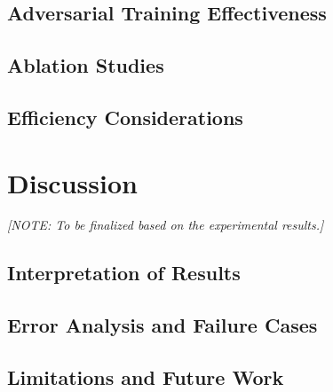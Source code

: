 \documentclass[conference,10pt]{IEEEtran}
\begin{document}
\subsection{Adversarial Training Effectiveness}

\subsection{Ablation Studies}

\subsection{Efficiency Considerations}


\section{Discussion}

\textit{[NOTE: To be finalized based on the experimental results.]}

\subsection{Interpretation of Results}

\subsection{Error Analysis and Failure Cases}

\subsection{Limitations and Future Work}


\end{document}
